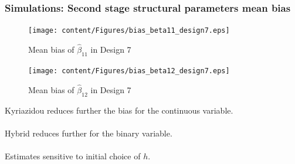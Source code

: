   \begin{frame}
    \frametitle{Simulations: Second stage structural parameters mean bias}
    \begin{minipage}{7cm}
    \begin{figure}[htbp]
      \centerline{\texttt{[image: content/Figures/bias\_beta11\_design7.eps]}}
      \caption{\footnotesize{Mean bias of  $\hat{\beta}_{11}$ in Design 7}}
      \label{bias_beta11_design7}
    \end{figure}
    \begin{figure}[htbp]
      \vspace{-2.5em}%
      \centerline{\texttt{[image: content/Figures/bias\_beta12\_design7.eps]}}
      \caption{\footnotesize{Mean bias of  $\hat{\beta}_{12}$ in Design 7}}
      \label{bias_beta12_design7}
    \end{figure}
  \end{minipage}%
  \begin{minipage}{5cm}
    Kyriazidou reduces further the bias for the continuous variable.\\~\\
    Hybrid reduces further for the binary variable. \\~\\
    Estimates sensitive to initial choice of $h$.\\
    \hyperlink{qqplots}{}
  \end{minipage}
  \end{frame}



